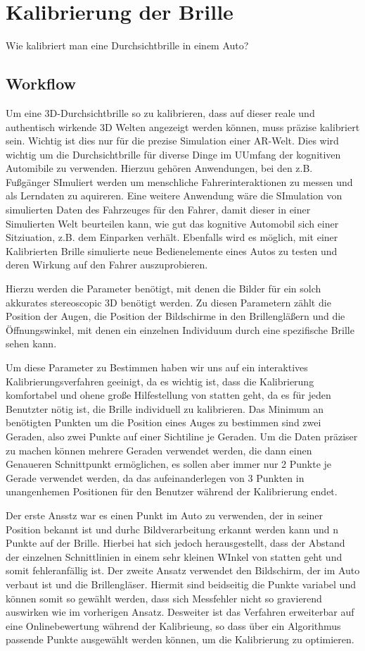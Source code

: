 \section{Kalibrierung der Brille}

Wie kalibriert man eine Durchsichtbrille in einem Auto?

\subsection{Workflow}
    Um eine 3D-Durchsichtbrille so zu kalibrieren, dass auf dieser reale und authentisch wirkende 3D Welten angezeigt werden können, muss präzise kalibriert sein. Wichtig ist dies nur für die prezise Simulation einer AR-Welt. Dies wird wichtig um die Durchsichtbrille für diverse Dinge im UUmfang der kognitiven Automibile zu verwenden. Hierzuu gehören Anwendungen, bei den z.B. Fußgänger SImuliert werden um menschliche Fahrerinteraktionen zu messen und als Lerndaten zu aquireren. Eine weitere Anwendung wäre die SImulation von simulierten Daten des Fahrzeuges für den Fahrer, damit dieser in einer Simulierten Welt beurteilen kann, wie gut das kognitive Automobil sich einer Sitziuation, z.B. dem Einparken verhält. Ebenfalls wird es möglich, mit einer Kalibrierten Brille simulierte neue Bedienelemente eines Autos zu testen und deren Wirkung auf den Fahrer auszuprobieren.

    Hierzu werden die Parameter benötigt, mit denen die Bilder für ein solch akkurates stereoscopic 3D benötigt werden. Zu diesen Parametern zählt die Position der Augen, die Position der Bildschirme in den Brillengläßern und die Öffnungswinkel, mit denen ein einzelnen Individuum durch eine spezifische Brille sehen kann.

    Um diese Parameter zu Bestimmen haben wir uns auf ein interaktives Kalibrierungsverfahren geeinigt, da es wichtig ist, dass die Kalibrierung komfortabel und ohene große Hilfestellung von statten geht, da es für jeden Benutzter nötig ist, die Brille individuell zu kalibrieren. Das Minimum an benötigten Punkten um die Position eines Auges zu bestimmen sind zwei Geraden, also zwei Punkte auf einer Sichtiline je Geraden. Um die Daten präziser zu machen können mehrere Geraden verwendet werden, die dann einen Genaueren Schnittpunkt ermöglichen, es sollen aber immer nur 2 Punkte je Gerade verwendet werden, da das aufeinanderlegen von 3 Punkten in unangenhemen Positionen für den Benutzer während der Kalibrierung endet.

    Der erste Ansstz war es einen Punkt im Auto zu verwenden, der in seiner Position bekannt ist und durhc Bildverarbeitung erkannt werden kann und n Punkte auf der Brille. Hierbei hat sich jedoch herausgestellt, dass der Abstand der einzelnen Schnittlinien in einem sehr kleinen WInkel von statten geht und somit fehleranfällig ist. Der zweite Ansatz verwendet den Bildschirm, der im Auto verbaut ist und die Brillengläser. Hiermit sind beidseitig die Punkte variabel und können somit so gewählt werden, dass sich Messfehler nicht so gravierend auswirken wie im vorherigen Ansatz. Desweiter ist das Verfahren erweiterbar auf eine Onlinebewertung während der Kalibrieung, so dass über ein Algorithmus passende Punkte ausgewählt werden können, um die Kalibrierung zu optimieren.

